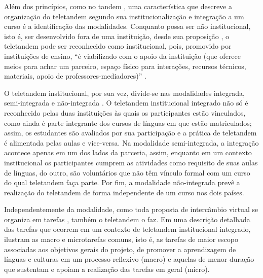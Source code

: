 \documentclass[portuguese]{textolivre}
\begin{document}
Além dos princípios, como no tandem \cite{brammerts2002}, uma característica que descreve a organização do teletandem segundo sua institucionalização e integração a um curso é a identificação das modalidades. Conquanto possa ser não institucional, isto é, ser desenvolvido fora de uma instituição, desde sua proposição \cite{telles2006a}, o teletandem pode ser reconhecido como institucional, pois, promovido por instituições de ensino, “é viabilizado com o apoio da instituição (que oferece meios para achar um parceiro, espaço físico para interações, recursos técnicos, materiais, apoio de professores-mediadores)” \cite[p. 187]{aranha2014}.

O teletandem institucional, por sua vez, divide-se nas modalidades integrada, semi-integrada e não-integrada \cite{aranha2014, cavalari2018}. O teletandem institucional integrado não só é reconhecido pelas duas instituições às quais os participantes estão vinculados, como ainda é parte integrante dos cursos de línguas em que estão matriculados; assim, os estudantes são avaliados por sua participação e a prática de teletandem é alimentada pelas aulas e vice-versa. Na modalidade semi-integrada, a integração acontece apenas em um dos lados da parceria, assim, enquanto em um contexto institucional os participantes cumprem as atividades como requisito de suas aulas de línguas, do outro, são voluntários que não têm vínculo formal com um curso do qual teletandem faça parte. Por fim, a modalidade não-integrada prevê a realização do teletandem de forma independente de um curso nos dois países.

Independentemente da modalidade, como toda proposta de intercâmbio virtual se organiza em tarefas \cite{rampazzamoore2024b, odowd2009}, também o teletandem o faz. Em uma descrição detalhada das tarefas que ocorrem em um contexto de teletandem institucional integrado, \textcite{aranha2017} ilustram as macro e microtarefas comuns, isto é, as tarefas de maior escopo associadas aos objetivos gerais do projeto, de promover a aprendizagem de línguas e culturas em um processo reflexivo (macro) e aquelas de menor duração que sustentam e apoiam a realização das tarefas em geral (micro).
\end{document}
